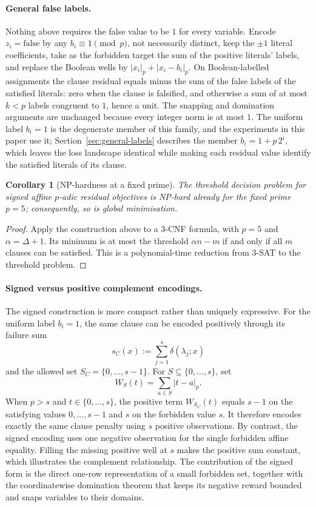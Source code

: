 \documentclass[11pt]{article}
\newtheorem{corollary}[theorem]{Corollary}
\begin{document}
\paragraph{General false labels.}
Nothing above requires the false value to be \(1\) for every variable. Encode \(z_i=\mathrm{false}\) by any \(b_i\equiv 1\pmod p\), not necessarily distinct, keep the \(\pm 1\) literal coefficients, take as the forbidden target the sum of the positive literals' labels, and replace the Boolean wells by \(|x_i|_p+|x_i-b_i|_p\). On Boolean-labelled assignments the clause residual equals minus the sum of the false labels of the satisfied literals: zero when the clause is falsified, and otherwise a sum of at most \(k<p\) labels congruent to \(1\), hence a unit. The snapping and domination arguments are unchanged because every integer norm is at most \(1\). The uniform label \(b_i=1\) is the degenerate member of this family, and the experiments in this paper use it; Section~\ref{sec:general-labels} describes the member \(b_i=1+p\,2^{i}\), which leaves the loss landscape identical while making each residual value identify the satisfied literals of its clause.

\begin{corollary}[NP-hardness at a fixed prime]
\label{cor:signed-nphard}
The threshold decision problem for signed affine \(p\)-adic residual objectives is NP-hard already for the fixed prime \(p=5\); consequently, so is global minimisation.
\end{corollary}

\begin{proof}
Apply the construction above to a \(3\)-CNF formula, with \(p=5\) and \(\alpha=\Delta+1\). Its minimum is at most the threshold \(\alpha n-m\) if and only if all \(m\) clauses can be satisfied. This is a polynomial-time reduction from \textsc{3-SAT} to the threshold problem.
\end{proof}

\paragraph{Signed versus positive complement encodings.}
The signed construction is more compact rather than uniquely expressive. For the uniform label \(b_i=1\), the same clause can be encoded positively through its failure sum
\[
s_C(x):=\sum_{j=1}^{s}\delta(\lambda_j;x)
\]
and the allowed set \(S_C=\{0,\dots,s-1\}\). For \(S\subseteq\{0,\dots,s\}\), set
\[
W_S(t)=\sum_{a\in S}|t-a|_p.
\]
When \(p>s\) and \(t\in\{0,\dots,s\}\), the positive term \(W_{S_C}(t)\) equals \(s-1\) on the satisfying values \(0,\dots,s-1\) and \(s\) on the forbidden value \(s\). It therefore encodes exactly the same clause penalty using \(s\) positive observations. By contrast, the signed encoding uses one negative observation for the single forbidden affine equality. Filling the missing positive well at \(s\) makes the positive sum constant, which illustrates the complement relationship. The contribution of the signed form is the direct one-row representation of a small forbidden set, together with the coordinatewise domination theorem that keeps its negative reward bounded and snaps variables to their domains.
\end{document}
